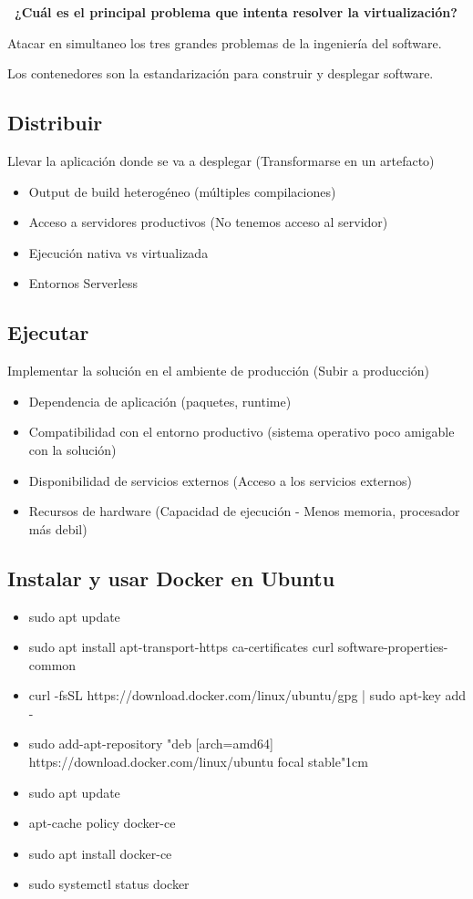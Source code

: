 \documentclass{article}
\begin{document}
{\bf\ ¿Cuál es el principal problema que intenta resolver la virtualización?}

\par Atacar en simultaneo los tres grandes problemas de la ingeniería del software.

Los contenedores son la estandarización para construir y desplegar software.

\subsection{Distribuir}
Llevar la aplicación donde se va a desplegar (Transformarse en un artefacto)

\begin{itemize}
    \item Output de build heterogéneo (múltiples compilaciones)
    \item Acceso a servidores productivos (No tenemos acceso al servidor)
    \item Ejecución nativa vs virtualizada
    \item Entornos Serverless
\end{itemize}

\subsection{Ejecutar}
Implementar la solución en el ambiente de producción (Subir a producción)

\begin{itemize}
    \item Dependencia de aplicación (paquetes, runtime)
    \item Compatibilidad con el entorno productivo (sistema operativo poco amigable con la solución)
    \item Disponibilidad de servicios externos (Acceso a los servicios externos)
    \item Recursos de hardware (Capacidad de ejecución - Menos memoria, procesador más debil)
\end{itemize}

\subsection{Instalar y usar Docker en Ubuntu}

\begin{itemize}
    \item sudo apt update
    \item sudo apt install apt-transport-https ca-certificates curl software-properties-common
    \item curl -fsSL https://download.docker.com/linux/ubuntu/gpg | sudo apt-key add -
    \item sudo add-apt-repository "deb [arch=amd64] https://download.docker.com/linux/ubuntu focal stable"1cm
    \item sudo apt update
    \item apt-cache policy docker-ce
    \item sudo apt install docker-ce
    \item sudo systemctl status docker

\end{itemize}
\end{document}
